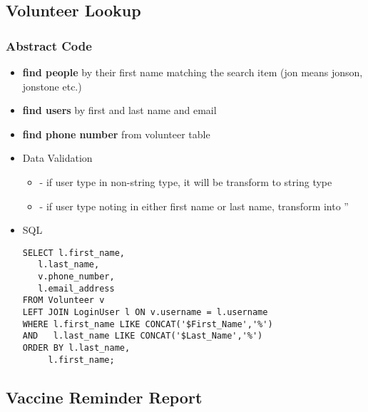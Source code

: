 \documentclass[a4paper]{article}
\begin{document}
\begin{itemize}
\begin{verbatim}
\end{verbatim}




\end{itemize}




\hypertarget{volunteer_lookup}{\subsection{Volunteer Lookup}}

\subsubsection*{Abstract Code}

\begin{itemize}
	\item \textbf{find people} by their first name matching the search item (jon means jonson, jonstone etc.)
	\item \textbf{find users} by first and last name and email
    \item \textbf{find phone number} from volunteer table
    \item Data Validation
\begin{itemize}

\item - if user type in non-string type, it will be transform to string type
\item - if user type noting in either first name or last name, transform into ''

\end{itemize}

\item SQL
\begin{verbatim}
SELECT l.first_name,
   l.last_name,
   v.phone_number,
   l.email_address
FROM Volunteer v
LEFT JOIN LoginUser l ON v.username = l.username
WHERE l.first_name LIKE CONCAT('$First_Name','%')
AND   l.last_name LIKE CONCAT('$Last_Name','%')
ORDER BY l.last_name,
     l.first_name;
\end{verbatim}

\end{itemize}




\hypertarget{vaccine_reminder_report}{\subsection{Vaccine Reminder Report }}
\end{document}
